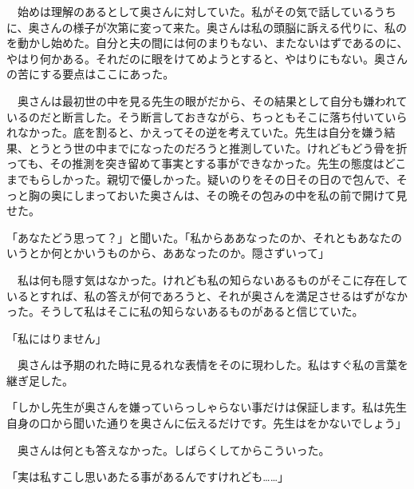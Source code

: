 \documentclass[a4j,onecolumn]{tarticle}
\begin{document}
\par{}
　始めは理解のあるとして奥さんに対していた。\hbox{}私がその気で話しているうちに、\hbox{}奥さんの様子が次第に変って来た。\hbox{}奥さんは私の頭脳に訴える代りに、\hbox{}私のを動かし始めた。\hbox{}自分と夫の間には何のまりもない、\hbox{}またないはずであるのに、\hbox{}やはり何かある。\hbox{}それだのに眼をけてめようとすると、\hbox{}やはりにもない。\hbox{}奥さんの苦にする要点はここにあった。\hbox{}\par{}
　奥さんは最初世の中を見る先生の眼がだから、\hbox{}その結果として自分も嫌われているのだと断言した。\hbox{}そう断言しておきながら、\hbox{}ちっともそこに落ち付いていられなかった。\hbox{}底を割ると、\hbox{}かえってその逆を考えていた。\hbox{}先生は自分を嫌う結果、\hbox{}とうとう世の中までになったのだろうと推測していた。\hbox{}けれどもどう骨を折っても、\hbox{}その推測を突き留めて事実とする事ができなかった。\hbox{}先生の態度はどこまでもらしかった。\hbox{}親切で優しかった。\hbox{}疑いのりをその日その日ので包んで、\hbox{}そっと胸の奥にしまっておいた奥さんは、\hbox{}その晩その包みの中を私の前で開けて見せた。\hbox{}\par{}
「あなたどう思って？」と聞いた。\hbox{}「私からああなったのか、\hbox{}それともあなたのいうとか何とかいうものから、\hbox{}ああなったのか。\hbox{}隠さずいって」\par{}
　私は何も隠す気はなかった。\hbox{}けれども私の知らないあるものがそこに存在しているとすれば、\hbox{}私の答えが何であろうと、\hbox{}それが奥さんを満足させるはずがなかった。\hbox{}そうして私はそこに私の知らないあるものがあると信じていた。\hbox{}\par{}
「私にはりません」\par{}
　奥さんは予期のれた時に見るれな表情をそのに現わした。\hbox{}私はすぐ私の言葉を継ぎ足した。\hbox{}\par{}
「しかし先生が奥さんを嫌っていらっしゃらない事だけは保証します。\hbox{}私は先生自身の口から聞いた通りを奥さんに伝えるだけです。\hbox{}先生はをかないでしょう」\par{}
　奥さんは何とも答えなかった。\hbox{}しばらくしてからこういった。\hbox{}\par{}
「実は私すこし思いあたる事があるんですけれども……」\par{}
\end{document}
